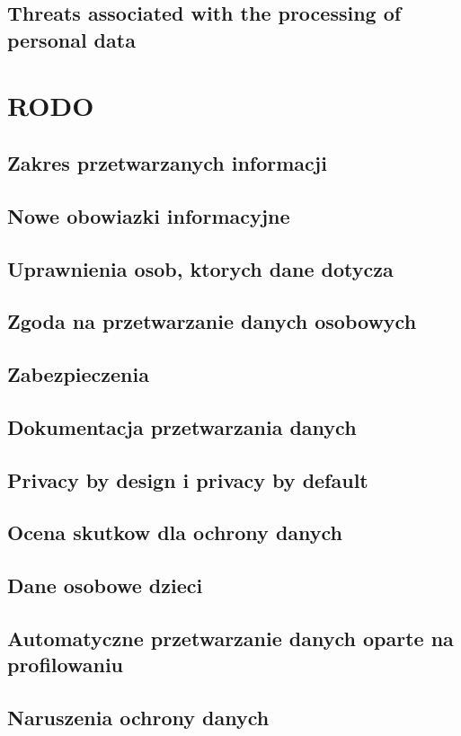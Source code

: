 \documentclass[en, noamssymb]{mgr}
\begin{document}
\section{Threats associated with the processing of personal data}

\chapter{RODO} \label{sec:sekcjaRODO}
\section{Zakres przetwarzanych informacji}
\section{Nowe obowiazki informacyjne}
\section{Uprawnienia osob, ktorych dane dotycza}
\section{Zgoda na przetwarzanie danych osobowych}
\section{Zabezpieczenia}
\section{Dokumentacja przetwarzania danych}
\section{Privacy by design i privacy by default}
\section{Ocena skutkow dla ochrony danych}
\section{Dane osobowe dzieci}
\section{Automatyczne przetwarzanie danych oparte na profilowaniu}
\section{Naruszenia ochrony danych}
\end{document}
